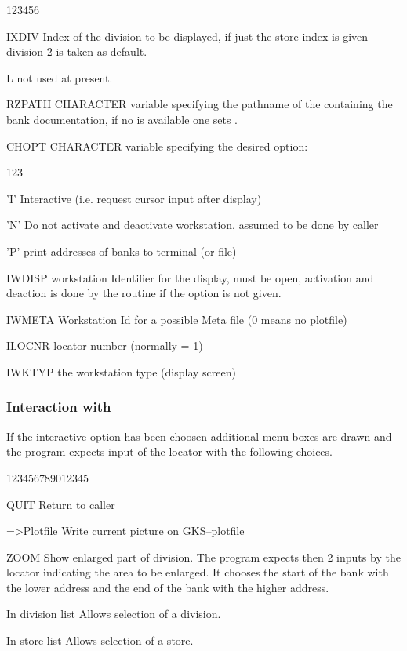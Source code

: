 \newpage
 
 
\Idesc
 
\begin{DLtt}{123456}
\item[IXDIV]  Index of the division to be displayed, if just the store index
              is given division 2 is taken as default.
\item[L]      not used at present.
\item[RZPATH] CHARACTER variable specifying the pathname of the \RZfile{} containing
              the bank documentation, if no \RZfile{} is available one sets 
              .
\item[CHOPT]  CHARACTER variable specifying the desired option:
  \begin{DLtt}{123}
     \item['I']  Interactive (i.e. request cursor input after display)
     \item['N']  Do not activate and deactivate workstation, assumed to be done
                 by caller
     \item['P']  print addresses of banks to terminal (or file)
  \end{DLtt}
\item[IWDISP] workstation Identifier for the display, 
               must be open, activation and deaction is done by the routine
              if the  option is not given.
\item[IWMETA] Workstation Id for a possible Meta file (0 means no plotfile)
\item[ILOCNR] locator number (normally = 1)
\item[IWKTYP] the workstation type (display screen)
\end{DLtt}
 
\subsubsection*{Interaction with }
 
If the interactive option has been choosen additional menu
boxes are drawn and the program expects input
of the locator with the following choices.
 
\begin{DLtt}{123456789012345}
\item[QUIT]       Return to caller
\item[=>Plotfile] Write current picture on GKS--plotfile
\item[ZOOM]       Show enlarged part of division.
                  The program expects then 2 inputs by the locator
                  indicating the area to be enlarged. 
                  It chooses the start of the bank with the lower address and the end
                  of the bank with the higher address.
\item[In division list] Allows selection of a division.
\item[In store list]    Allows selection of a store.
\end{DLtt}
 
